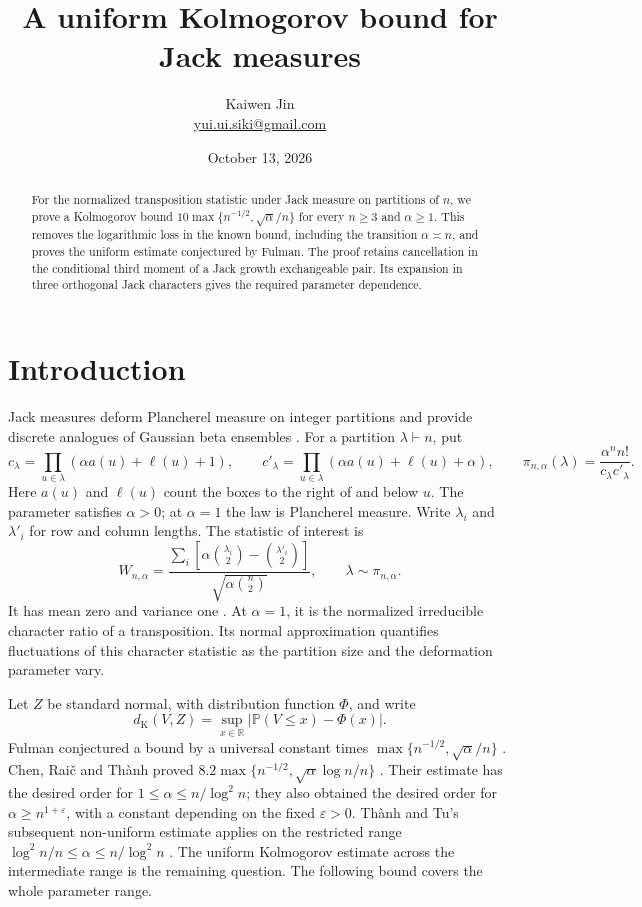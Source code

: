 \documentclass[11pt]{article}
\title{A uniform Kolmogorov bound for Jack measures}
\author{Kaiwen Jin\\\small\href{mailto:yui.ui.siki@gmail.com}{yui.ui.siki@gmail.com}}
\date{October 13, 2026}
\newcommand{\Prob}{\mathbb P}
\newcommand{\dK}{d_{\mathrm K}}
\begin{document}
\maketitle
\begin{abstract}
For the normalized transposition statistic under Jack measure on partitions
of $n$, we prove a Kolmogorov bound
$10\max\{n^{-1/2},\sqrt\alpha/n\}$ for every $n\ge3$ and $\alpha\ge1$.
This removes the logarithmic loss in the known bound, including the transition
$\alpha\asymp n$, and proves the uniform estimate conjectured by Fulman.
The proof retains cancellation in the conditional third moment of a Jack
growth exchangeable pair. Its expansion in three orthogonal Jack characters
gives the required parameter dependence.
\end{abstract}

\section{Introduction}

Jack measures deform Plancherel measure on integer partitions and provide
discrete analogues of Gaussian beta ensembles \cite{Fulman}.
For a partition $\lambda\vdash n$, put
\[
 c_\lambda=\prod_{u\in\lambda}(\alpha a(u)+\ell(u)+1),\qquad
 c'_\lambda=\prod_{u\in\lambda}(\alpha a(u)+\ell(u)+\alpha),
 \qquad
 \pi_{n,\alpha}(\lambda)=\frac{\alpha^n n!}{c_\lambda c'_\lambda}.
\]
Here $a(u)$ and $\ell(u)$ count the boxes to the right of and below $u$.
The parameter satisfies $\alpha>0$; at $\alpha=1$ the law is Plancherel
measure. Write $\lambda_i$ and $\lambda'_i$ for row and column lengths.
The statistic of interest is
\begin{equation}\label{eq:statistic}
 W_{n,\alpha}=
 \frac{\sum_i\left[\alpha\binom{\lambda_i}{2}-\binom{\lambda'_i}{2}\right]}
      {\sqrt{\alpha\binom n2}},\qquad \lambda\sim\pi_{n,\alpha}.
\end{equation}
It has mean zero and variance one \cite[Lemmas~3.1--3.2]{Fulman}.
At $\alpha=1$, it is the normalized
irreducible character ratio of a transposition. Its normal approximation
quantifies fluctuations of this character statistic as the partition size
and the deformation parameter vary.

Let $Z$ be standard normal, with distribution function $\Phi$, and write
\[
 \dK(V,Z)=\sup_{x\in\mathbb R}|\Prob(V\le x)-\Phi(x)|.
\]
Fulman conjectured a bound by a universal constant times
$\max\{n^{-1/2},\sqrt\alpha/n\}$ \cite[p.~4 of the author version]{Fulman}.
Chen, Rai\v c and Th\`anh proved
$8.2\max\{n^{-1/2},\sqrt\alpha\log n/n\}$
\cite[Proposition~4.1]{CRT}.
Their estimate has the desired order for $1\le\alpha\le n/\log^2n$;
they also obtained the desired order for $\alpha\ge n^{1+\varepsilon}$,
with a constant depending on the fixed $\varepsilon>0$.
Th\`anh and Tu's subsequent non-uniform estimate applies on the restricted
range $\log^2 n/n\le\alpha\le n/\log^2 n$ \cite[Theorem~8]{TT}.
The uniform Kolmogorov estimate across the intermediate range is the
remaining question. The following bound covers the whole parameter range.
\end{document}
